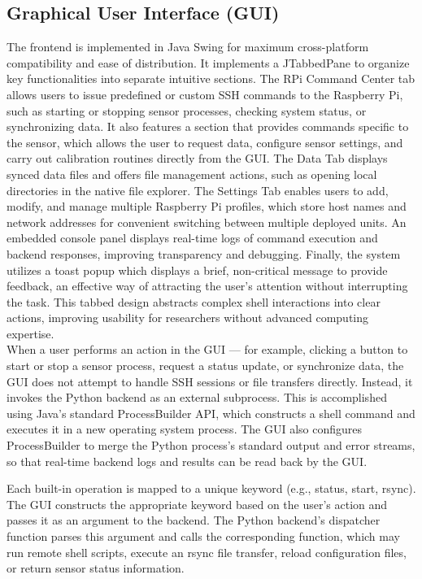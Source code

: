 \documentclass{article}
\begin{document}
 \subsection{Graphical User Interface (GUI)}
The frontend is implemented in Java Swing for maximum cross-platform compatibility and ease of distribution. It implements a JTabbedPane to organize key functionalities into separate intuitive sections. The RPi Command Center tab allows users to issue predefined or custom SSH commands to the Raspberry Pi, such as starting or stopping sensor processes, checking system status, or synchronizing data. It also features a section that provides commands specific to the sensor, which allows the user to request data, configure sensor settings, and carry out calibration routines directly from the GUI. The Data Tab displays synced data files and offers file management actions, such as opening local directories in the native file explorer. The Settings Tab enables users to add, modify, and manage multiple Raspberry Pi profiles, which store host names and network addresses for convenient switching between multiple deployed units. An embedded console panel displays real-time logs of command execution and backend responses, improving transparency and debugging. Finally, the system utilizes a toast popup which displays a brief, non-critical message to provide feedback, an effective way of attracting the user’s attention without interrupting the task. This tabbed design abstracts complex shell interactions into clear actions, improving usability for researchers without advanced computing expertise.\\

When a user performs an action in the GUI — for example, clicking a button to start or stop a sensor process, request a status update, or synchronize data, the GUI does not attempt to handle SSH sessions or file transfers directly. Instead, it invokes the Python backend as an external subprocess. This is accomplished using Java’s standard ProcessBuilder API, which constructs a shell command and executes it in a new operating system process. The GUI also configures ProcessBuilder to merge the Python process’s standard output and error streams, so that real-time backend logs and results can be read back by the GUI.

Each built-in operation is mapped to a unique keyword (e.g., status, start, rsync). The GUI constructs the appropriate keyword based on the user’s action and passes it as an argument to the backend. The Python backend’s dispatcher function parses this argument and calls the corresponding function, which may run remote shell scripts, execute an rsync file transfer, reload configuration files, or return sensor status information.
\end{document}
